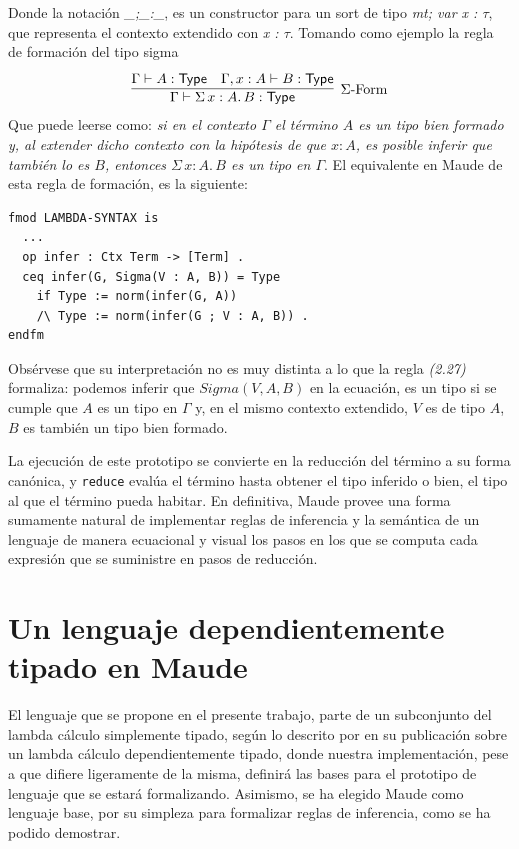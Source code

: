 Donde la notación \textit{\_;\_:\_}, es un constructor para un sort de tipo \textit{mt; var x : $\tau$}, que representa el contexto extendido con \textit{x : $\tau$}.
\newline
\newline
\indent Tomando como ejemplo la regla de formación del tipo sigma
\begin{gather}
  \infer[\text{$\Sigma$-Form}]
  {\Gamma \vdash \Sigma\, x : A.\, B : \Type}
  {\Gamma \vdash A : \Type
    & \deduce{\Gamma, x : A \vdash B : \Type}{}}
\end{gather}
Que puede leerse como: \textit{si en el contexto $\Gamma$ el t\'ermino $A$ es un tipo bien formado y, al extender dicho contexto con la hip\'otesis de que $x : A$, es posible inferir que también lo es $B$, entonces $\Sigma\, x : A.\, B$ es un tipo en $\Gamma$}. El equivalente en Maude de esta regla de formación, es la siguiente:

\begin{lstlisting}
fmod LAMBDA-SYNTAX is
  ...
  op infer : Ctx Term -> [Term] .
  ceq infer(G, Sigma(V : A, B)) = Type
    if Type := norm(infer(G, A))
    /\ Type := norm(infer(G ; V : A, B)) .
endfm
\end{lstlisting}

Obsérvese que su interpretación no es muy distinta a lo que la regla \textit{(2.27)} formaliza: podemos inferir que $Sigma(V, A, B)$ en la ecuación, es un tipo si se cumple que $A$ es un tipo en $\Gamma$ y, en el mismo contexto extendido, $V$ es de tipo $A$, $B$ es también un tipo bien formado.

La ejecución de este prototipo se convierte en la reducción del término a su forma canónica, y \texttt{reduce} evalúa el término hasta obtener el tipo inferido o bien, el tipo al que el término pueda habitar.
\newline
\newline
\indent En definitiva, Maude provee una forma sumamente natural de implementar reglas de inferencia y la semántica de un lenguaje de manera ecuacional y visual los pasos en los que se computa cada expresión que se suministre en pasos de reducción.

\chapter{Un lenguaje dependientemente tipado en Maude}\label{ch:lang}
El lenguaje que se propone en el presente trabajo, parte de un subconjunto del lambda cálculo simplemente tipado, según lo descrito por \citet{loh2010} en su publicación sobre un lambda cálculo dependientemente tipado, donde nuestra implementación, pese a que difiere ligeramente de la misma, definirá las bases para el prototipo de lenguaje que se estará formalizando. Asimismo, se ha elegido Maude como lenguaje base, por su simpleza para formalizar reglas de inferencia, como se ha podido demostrar.

